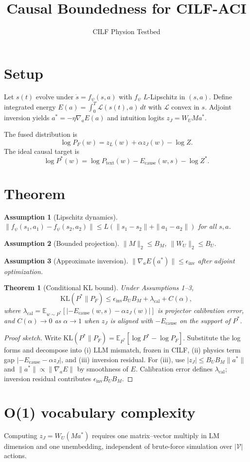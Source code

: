 \documentclass[11pt]{article}
\title{Causal Boundedness for CILF-ACI}
\author{CILF Physion Testbed}
\newtheorem{theorem}{Theorem}
\newtheorem{assumption}{Assumption}
\begin{document}
\maketitle

\section{Setup}
Let $s(t)$ evolve under $\dot{s} = f_\psi(s,a)$ with $f_\psi$ $L$-Lipschitz in $(s,a)$.
Define integrated energy $E(a)=\int_0^T \mathcal{L}(s(t),a)\,dt$ with $\mathcal{L}$ convex in $s$.
Adjoint inversion yields $a^* = -\eta \nabla_a E(a)$ and intuition logits $z_J = W_U M a^*$.

The fused distribution is
\[
\log P_F(w) = z_L(w) + \alpha z_J(w) - \log Z.
\]
The ideal causal target is
\[
\log P^*(w) = \log P_{\text{text}}(w) - E_{\text{cause}}(w,s) - \log Z^*.
\]

\section{Theorem}
\begin{assumption}[Lipschitz dynamics]
$\|f_\psi(s_1,a_1)-f_\psi(s_2,a_2)\| \le L(\|s_1-s_2\|+\|a_1-a_2\|)$ for all $s,a$.
\end{assumption}

\begin{assumption}[Bounded projection]
$\|M\|_2 \le B_M$, $\|W_U\|_2 \le B_U$.
\end{assumption}

\begin{assumption}[Approximate inversion]
$\|\nabla_a E(a^*)\| \le \epsilon_{\text{inv}}$ after adjoint optimization.
\end{assumption}

\begin{theorem}[Conditional KL bound]
Under Assumptions 1--3,
\[
\mathrm{KL}(P^* \| P_F)
\le \epsilon_{\text{inv}} B_U B_M + \lambda_{\text{cal}} + C(\alpha),
\]
where $\lambda_{\text{cal}} = \mathbb{E}_{w\sim P^*}[|{-E_{\text{cause}}(w,s)} - \alpha z_J(w)|]$ is projector calibration error,
and $C(\alpha)\to 0$ as $\alpha\to 1$ when $z_J$ is aligned with $-E_{\text{cause}}$ on the support of $P^*$.
\end{theorem}

\begin{proof}[Proof sketch]
Write $\mathrm{KL}(P^*\|P_F)=\mathbb{E}_{P^*}[\log P^* - \log P_F]$.
Substitute the log forms and decompose into (i) LLM mismatch, frozen in CILF, (ii) physics term gap
$|{-E_{\text{cause}}}-\alpha z_J|$, and (iii) inversion residual.
For (iii), use $|z_J| \le B_U B_M \|a^*\|$ and $\|a^*\|\propto \|\nabla_a E\|$ by smoothness of $E$.
Calibration error defines $\lambda_{\text{cal}}$; inversion residual contributes $\epsilon_{\text{inv}} B_U B_M$.
\end{proof}

\section{O(1) vocabulary complexity}
Computing $z_J = W_U (M a^*)$ requires one matrix--vector multiply in LM dimension and one unembedding,
independent of brute-force simulation over $|\mathcal{V}|$ actions.
\end{document}
